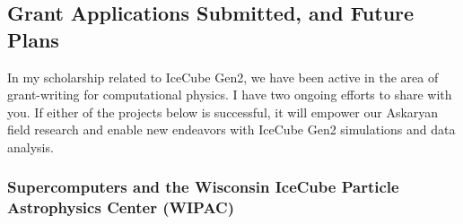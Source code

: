 \documentclass[../../../main.tex]{subfiles}
\begin{document}
\subsection{Grant Applications Submitted, and Future Plans}

In my scholarship related to IceCube Gen2, we have been active in the area of grant-writing for computational physics.  I have two ongoing efforts to share with you.  If either of the projects below is successful, it will empower our Askaryan field research and enable new endeavors with IceCube Gen2 simulations and data analysis.

\subsubsection{Supercomputers and the Wisconsin IceCube Particle Astrophysics Center (WIPAC)}
\end{document}
